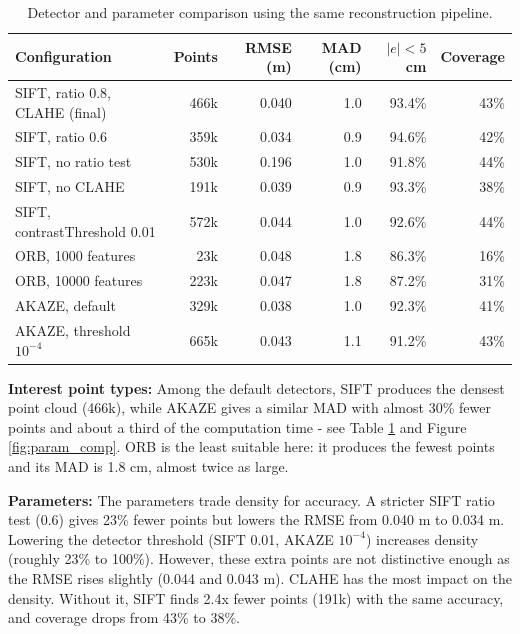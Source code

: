 \documentclass[12pt]{article}
\begin{document}
\begin{table}[H]
    \centering
    \caption{Detector and parameter comparison using the same reconstruction pipeline.}
    \label{tab:detector_comparison}
    \scriptsize
    \setlength{\tabcolsep}{3pt}
    \begin{tabular}{lrrrrr}
        \toprule
        Configuration & Points & RMSE (m) & MAD (cm) & $|e|<5$ cm & Coverage \\
        \midrule
        SIFT, ratio 0.8, CLAHE (final) & 466k & 0.040 & 1.0 & 93.4\% & 43\% \\
        SIFT, ratio 0.6 & 359k & 0.034 & 0.9 & 94.6\% & 42\% \\
        SIFT, no ratio test & 530k & 0.196 & 1.0 & 91.8\% & 44\% \\
        SIFT, no CLAHE & 191k & 0.039 & 0.9 & 93.3\% & 38\% \\
        SIFT, contrastThreshold 0.01 & 572k & 0.044 & 1.0 & 92.6\% & 44\% \\
        ORB, 1000 features & 23k & 0.048 & 1.8 & 86.3\% & 16\% \\
        ORB, 10000 features & 223k & 0.047 & 1.8 & 87.2\% & 31\% \\
        AKAZE, default & 329k & 0.038 & 1.0 & 92.3\% & 41\% \\
        AKAZE, threshold $10^{-4}$ & 665k & 0.043 & 1.1 & 91.2\% & 43\% \\
        \bottomrule
    \end{tabular}
\end{table}

\textbf{Interest point types:} Among the default detectors, SIFT produces the densest point cloud (466k), while AKAZE gives a similar MAD with almost 30\% fewer points and about a third of the computation time - see Table \ref{tab:detector_comparison} and Figure \ref{fig:param_comp}. ORB is the least suitable here: it produces the fewest points and its MAD is 1.8 cm, almost twice as large.

\textbf{Parameters:} The parameters trade density for accuracy. A stricter SIFT ratio test (0.6) gives 23\% fewer points but lowers the RMSE from 0.040 m to 0.034 m. Lowering the detector threshold (SIFT 0.01, AKAZE \(10^{-4}\)) increases density (roughly 23\% to 100\%). However, these extra points are not distinctive enough as the RMSE rises slightly (0.044 and 0.043 m). CLAHE has the most impact on the density. Without it, SIFT finds 2.4x fewer points (191k) with the same accuracy, and coverage drops from 43\% to 38\%.
\end{document}

